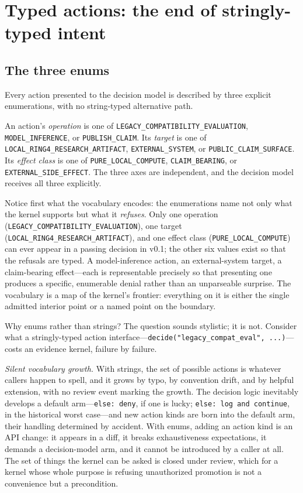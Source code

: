 \section{Typed actions: the end of stringly-typed intent}\label{ch09:actions}

\subsection{The three enums}\label{ch09:enums}

Every action presented to the decision model is described by three explicit enumerations, with no string-typed alternative path.

\begin{definition}\label{ch09:def:vocab}
An action's \emph{operation} is one of \texttt{LEGACY\_COMPATIBILITY\_EVALUATION}, \texttt{MODEL\_INFERENCE}, or \texttt{PUBLISH\_CLAIM}. Its \emph{target} is one of \texttt{LOCAL\_RING4\_RESEARCH\_ARTIFACT}, \texttt{EXTERNAL\_SYSTEM}, or \texttt{PUBLIC\_CLAIM\_SURFACE}. Its \emph{effect class} is one of \texttt{PURE\_LOCAL\_COMPUTE}, \texttt{CLAIM\_BEARING}, or \texttt{EXTERNAL\_SIDE\_EFFECT}. The three axes are independent, and the decision model receives all three explicitly.
\end{definition}

Notice first what the vocabulary encodes: the enumerations name not only what the kernel supports but what it \emph{refuses}. Only one operation (\texttt{LEGACY\_COMPATIBILITY\_EVALUATION}), one target (\texttt{LOCAL\_RING4\_RESEARCH\_ARTIFACT}), and one effect class (\texttt{PURE\_LOCAL\_COMPUTE}) can ever appear in a passing decision in v0.1; the other six values exist so that the refusals are typed. A model-inference action, an external-system target, a claim-bearing effect---each is representable precisely so that presenting one produces a specific, enumerable denial rather than an unparseable surprise. The vocabulary is a map of the kernel's frontier: everything on it is either the single admitted interior point or a named point on the boundary.

Why enums rather than strings? The question sounds stylistic; it is not. Consider what a stringly-typed action interface---\texttt{decide("legacy\_compat\_eval", ...)}---costs an evidence kernel, failure by failure.

\emph{Silent vocabulary growth.} With strings, the set of possible actions is whatever callers happen to spell, and it grows by typo, by convention drift, and by helpful extension, with no review event marking the growth. The decision logic inevitably develops a default arm---\texttt{else: deny}, if one is lucky; \texttt{else: log and continue}, in the historical worst case---and new action kinds are born into the default arm, their handling determined by accident. With enums, adding an action kind is an API change: it appears in a diff, it breaks exhaustiveness expectations, it demands a decision-model arm, and it cannot be introduced by a caller at all. The set of things the kernel can be asked is closed under review, which for a kernel whose whole purpose is refusing unauthorized promotion is not a convenience but a precondition.

